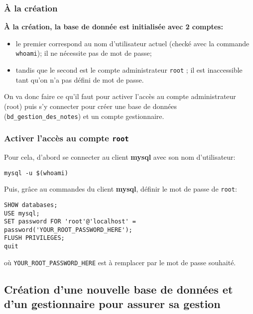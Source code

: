 \documentclass[11pt]{article}
\begin{document}
\subsubsection{À la création}
\label{sec:orgaf5512a}

\textbf{À la création, la base de donnée est initialisée avec 2 comptes:} 
\begin{itemize}
\item le premier correspond au nom d'utilisateur actuel (checké avec la commande \texttt{whoami}); il ne nécessite pas de mot de passe;
\item tandis que le second est le compte administrateur \texttt{root} ; il est inaccessible tant qu'on n'a pas défini de mot de passe.
\end{itemize}

On va donc faire ce qu'il faut pour activer l'accès au compte administrateur (root) puis s'y connecter pour créer une base de données (\texttt{bd\_gestion\_des\_notes}) et un compte gestionnaire.  

\subsubsection{Activer l'accès au compte \texttt{root}}
\label{sec:org20dd098}

Pour cela, d'abord se connecter au client \textbf{mysql}  avec son nom d'utilisateur:

\begin{verbatim}
mysql -u $(whoami)
\end{verbatim}

Puis, grâce au commandes du client \textbf{mysql}, définir le mot de passe de \texttt{root}:

\begin{verbatim}
SHOW databases;
USE mysql;
SET password FOR 'root'@'localhost' = 
password('YOUR_ROOT_PASSWORD_HERE');
FLUSH PRIVILEGES;
quit
\end{verbatim}

où \texttt{YOUR\_ROOT\_PASSWORD\_HERE} est à remplacer par le mot de passe souhaité.

\subsection{Création d'une nouvelle base de données et d'un gestionnaire pour assurer sa gestion}
\label{sec:orgf62bb72}
\end{document}
